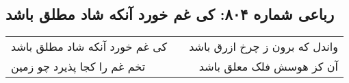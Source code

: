 \begin{center}
\section*{رباعی شماره ۸۰۴: کی غم خورد آنکه شاد مطلق باشد}
\label{sec:0804}
\begin{longtable}{l p{0.5cm} r}
کی غم خورد آنکه شاد مطلق باشد
&&
واندل که برون ز چرخ ازرق باشد
\\
تخم غم را کجا پذیرد چو زمین
&&
آن کز هوسش فلک معلق باشد
\\
\end{longtable}
\end{center}
